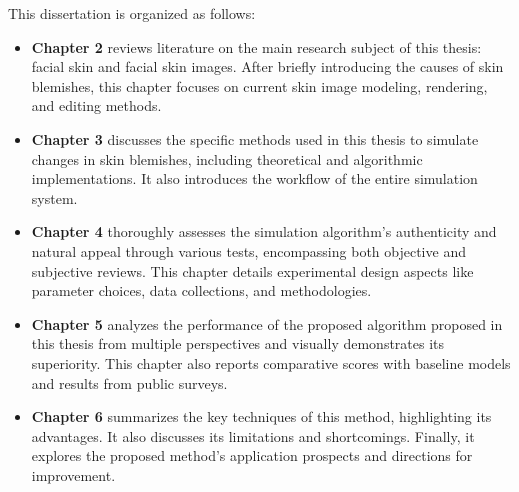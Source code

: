 \begin{spacing}{1.5}
This dissertation is organized as follows:
\begin{itemize}
    \item \textbf{Chapter 2} reviews literature on the main research subject of this thesis: facial skin and facial skin images. After briefly introducing the causes of skin blemishes, this chapter focuses on current skin image modeling, rendering, and editing methods.
    \item \textbf{Chapter 3} discusses the specific methods used in this thesis to simulate changes in skin blemishes, including theoretical and algorithmic implementations. It also introduces the workflow of the entire simulation system.
    \item \textbf{Chapter 4} thoroughly assesses the simulation algorithm's authenticity and natural appeal through various tests, encompassing both objective and subjective reviews. This chapter details experimental design aspects like parameter choices, data collections, and methodologies.
    \item \textbf{Chapter 5} analyzes the performance of the proposed algorithm proposed in this thesis from multiple perspectives and visually demonstrates its superiority. This chapter also reports comparative scores with baseline models and results from public surveys.
    \item \textbf{Chapter 6} summarizes the key techniques of this method, highlighting its advantages. It also discusses its limitations and shortcomings. Finally, it explores the proposed method's application prospects and directions for improvement.
\end{itemize}

\end{spacing}
\newpage


